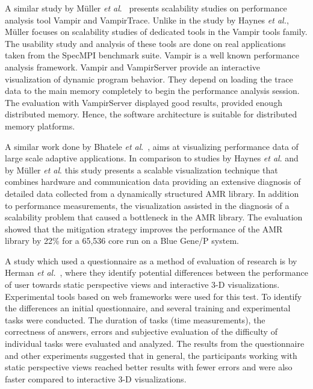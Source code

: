 A similar study by M{\"{u}}ller \textit{et al}.~\cite{DBLP:conf/parco/MullerKJLBMN07} presents scalability studies on performance analysis tool Vampir and VampirTrace. Unlike in the study by Haynes \textit{et al.},  M{\"{u}}ller focuses on scalability studies of dedicated tools in the Vampir tools family. The usability study and analysis of these tools are done on real applications taken from the SpecMPI benchmark suite. Vampir is a well known performance analysis framework. Vampir and VampirServer provide an interactive visualization of dynamic program behavior. They depend on loading the trace data to the main memory completely to begin the performance analysis session. The evaluation with VampirServer displayed good results, provided enough distributed memory. Hence, the software architecture is suitable for distributed memory platforms.

A similar work done by Bhatele \textit{et al}.~\cite{DBLP:conf/sc/BhateleGIGSBH12}, aims at visualizing performance data of large scale adaptive applications. In comparison to studies by Haynes  \textit{et al}. and by M{\"{u}}ller \textit{et al}. this study presents a scalable visualization technique that combines hardware and communication data providing an extensive diagnosis of detailed data collected from a dynamically structured AMR library. In addition to performance measurements, the visualization assisted in the diagnosis of a scalability problem that caused a bottleneck in the AMR library. The evaluation showed that the mitigation strategy improves the performance of the AMR library by 22\% for a 65,536 core run on a Blue Gene/P system. 

A study which used a questionnaire as a method of evaluation of research is by Herman \textit{et al.}~\cite{DBLP:article/tog/Herman16}, where they identify potential differences between the performance of user towards static perspective views and interactive 3-D visualizations. Experimental tools based on web frameworks were used for this test. To identify the differences an initial questionnaire, and several training and experimental tasks were conducted. The duration of tasks (time measurements), the correctness
of answers, errors and subjective evaluation of the difficulty of
individual tasks were evaluated and analyzed. The results from the questionnaire and other experiments suggested that in general, the participants working with static perspective views reached better results with fewer errors and were also faster compared to interactive 3-D visualizations.